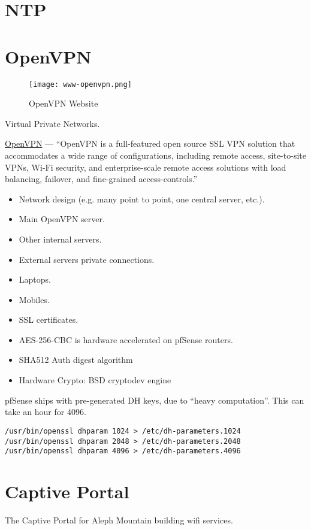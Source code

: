 \section{NTP}


\section{OpenVPN}
\begin{figure}[h!]
\texttt{[image: www-openvpn.png]}
 \caption{OpenVPN Website}
 \label{fig:www-openvpn}
\end{figure}


Virtual Private Networks.


\href{https://www.openvpn.net/}{OpenVPN} --- ``OpenVPN is a full-featured open source SSL VPN solution that accommodates a wide range of configurations, including remote access, site-to-site VPNs, Wi-Fi security, and enterprise-scale remote access solutions with load balancing, failover, and fine-grained access-controls.''

\begin{itemize}
 \item Network design (e.g. many point to point, one central server, etc.).
 \item Main OpenVPN server.
 \item Other internal servers.
 \item External servers private connections.
 \item Laptops.
 \item Mobiles.
 \item SSL certificates.
 \item AES-256-CBC is hardware accelerated on pfSense routers.
 \item SHA512 Auth digest algorithm
 \item Hardware Crypto: BSD cryptodev engine
\end{itemize}


pfSense ships with pre-generated DH keys, due to ``heavy computation''.
This can take an hour for 4096.
\begin{verbatim}
/usr/bin/openssl dhparam 1024 > /etc/dh-parameters.1024
/usr/bin/openssl dhparam 2048 > /etc/dh-parameters.2048
/usr/bin/openssl dhparam 4096 > /etc/dh-parameters.4096
\end{verbatim}



\section{Captive Portal}
The Captive Portal for Aleph Mountain building wifi services.


